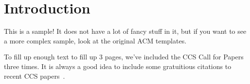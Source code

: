 \section{Introduction}
\label{sec:intro}
This is a sample!  It does not have a lot of fancy stuff in it, but if
you want to see a more complex sample, look at the original ACM
templates.

To fill up enough text to fill up 3 pages, we've included the CCS Call
for Papers three times.  It is always a good idea to include some
gratuitious citations to recent CCS papers~\cite{medvinsky1993netcash,
  bellare1993random, anderson1993cryptosystems, blaze1993cryptographic}.
